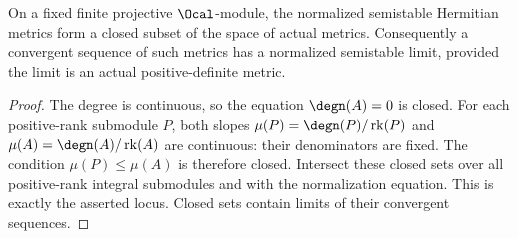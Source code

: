 \begin{lemma}
\label{lem:normalized-semistable-closed}
\leanok
{}
On a fixed finite projective $\Ocal$-module, the normalized semistable
Hermitian metrics form a closed subset of the space of actual metrics.
Consequently a convergent sequence of such metrics has a normalized
semistable limit, provided the limit is an actual positive-definite metric.
\end{lemma}
\begin{proof}
The degree is continuous, so the equation $\degn(A)=0$ is closed.
For each positive-rank submodule $P$, both slopes
$\mu(P)=\degn(P)/\operatorname{rk}(P)$ and
$\mu(A)=\degn(A)/\operatorname{rk}(A)$ are continuous: their
denominators are fixed. The condition $\mu(P)\leq\mu(A)$ is therefore
closed. Intersect these closed sets over all positive-rank integral
submodules and with the normalization equation. This is exactly the
asserted locus. Closed sets contain limits of their convergent sequences.
\end{proof}

